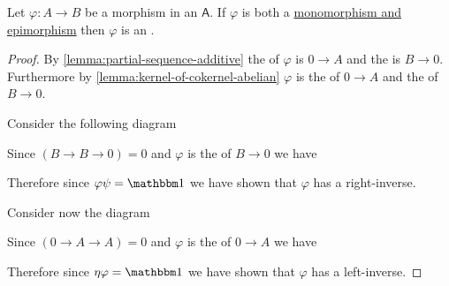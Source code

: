 \documentclass[../../main]{subfiles}
\begin{document}
\begin{lemma}
  Let \(\varphi: A \to B\) be a morphism in an  \(\mathsf{A}\).
  If \(\varphi\) is both a \hyperref[def:mono-epi-morphism]{monomorphism and epimorphism} then \(\varphi\) is an .
\end{lemma}
\begin{proof}
  By \autoref{lemma:partial-sequence-additive} the  of \(\varphi\) is \(0 \to A\) and the  is \(B \to 0\).
  Furthermore by \autoref{lemma:kernel-of-cokernel-abelian} \(\varphi\) is the  of \(0 \to A\) and the  of \(B \to 0\).

  Consider the following diagram
  \begin{center}
  \end{center}
  Since \((B \to B \to 0) = 0\) and \(\varphi\) is the  of \(B \to 0\) we have
  \begin{center}
  \end{center}
  Therefore since \(\varphi \psi = \id\) we have shown that \(\varphi\) has a right-inverse.

  Consider now the diagram
  \begin{center}
  \end{center}
  Since \((0 \to A \to A) = 0\) and \(\varphi\) is the  of \(0 \to A\) we have
  \begin{center}
  \end{center}
  Therefore since \(\eta \varphi = \id\) we have shown that \(\varphi\) has a left-inverse.
\end{proof}
\end{document}
